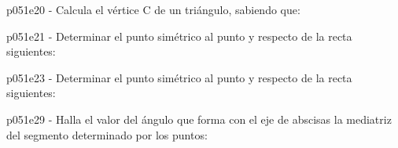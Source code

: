 \documentclass[spanish, 11pt]{exam}
\begin{document}
\begin{questions}
\begin{multicols}{2}
\begin{parts}
        \end{parts}
        \end{multicols}
        \question p051e20 - Calcula el vértice C de un triángulo, sabiendo que:
        \begin{multicols}{1} 
        \end{multicols}
        \question p051e21 - Determinar el punto simétrico al punto y respecto de la recta siguientes:
        \begin{multicols}{1} 
        \end{multicols}
        \question p051e23 - Determinar el punto simétrico al punto y respecto de la recta siguientes:
        \begin{multicols}{1} 
        \end{multicols}
        \question p051e29 - Halla el valor del ángulo que forma con el eje de abscisas la mediatriz del segmento determinado por los puntos:
        \begin{multicols}{1} 
\end{multicols}
\end{questions}
\end{document}
